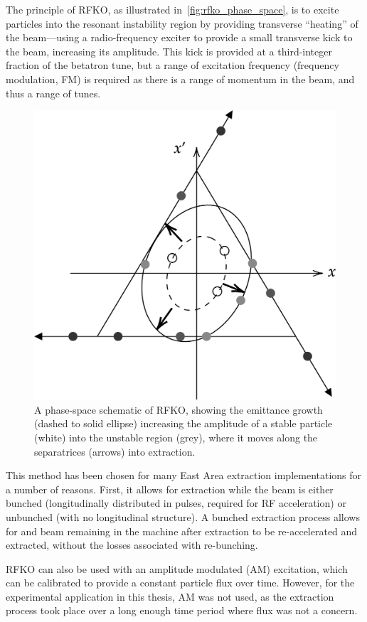\documentclass[11pt]{report}
\begin{document}
The principle of RFKO, as illustrated in~\autoref{fig:rfko_phase_space}, is to excite particles into the resonant instability region by providing transverse ``heating'' of the beam---using a radio-frequency exciter to provide a small transverse kick to the beam, increasing its amplitude. This kick is provided at a third-integer fraction of the betatron tune, but a range of excitation frequency (frequency modulation, FM) is required as there is a range of momentum in the beam, and thus a range of tunes. 

\begin{figure}
  \centering
  \includegraphics*[width=0.6\linewidth]{rfko-phase-space-schematic.png}
  \caption{A phase-space schematic of RFKO, showing the emittance growth (dashed to solid ellipse) increasing the amplitude of a stable particle (white) into the unstable region (grey), where it moves along the separatrices (arrows) into extraction.}\label{fig:rfko_phase_space}
\end{figure}

This method has been chosen for many East Area extraction implementations for a number of reasons. First, it allows for extraction while the beam is either bunched (longitudinally distributed in pulses, required for RF acceleration) or unbunched (with no longitudinal structure). A bunched extraction process allows for and beam remaining in the machine after extraction to be re-accelerated and extracted, without the losses associated with re-bunching.

RFKO can also be used with an amplitude modulated (AM) excitation, which can be calibrated to provide a constant particle flux over time. However, for the experimental application in this thesis, AM was not used, as the extraction process took place over a long enough time period where flux was not a concern.
\end{document}
